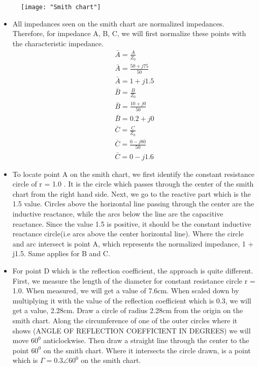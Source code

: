\begin{figure}
	\texttt{[image: "Smith chart"]}
\end{figure}
\begin{itemize}
	\item All impedances seen on the smith chart are normalized impedances. Therefore, for impedance A, B, C, we will first normalize these points with the characteristic impedance.\\
   \begin{align*}
   \bar{A}=\frac{A}{Z_{0}}\\
   \bar{A}=\frac{50 + j75}{50}\\
   \bar{A}=1+j1.5\\
   \bar{B}=\frac{B}{Z_{0}}\\
   \bar{B}= \frac{10 + j0}{50}\\
   \bar{B}=0.2+j0\\
   \bar{C}=\frac{C}{Z_{0}}\\
   \bar{C}= \frac{0 - j80}{50}\\
   \bar{C}=0-j1.6
   \end{align*}
	
	\item 
	To locate point A on the smith chart, we first identify the constant resistance circle of r = 1.0 . It is the circle which passes through the center of the smith chart from the right hand side. Next, we go to the reactive part which is the 1.5 value. Circles above the horizontal line passing through the center are the inductive reactance, while the arcs below the line are the capacitive reactance. Since the value 1.5 is positive, it should be the constant inductive reactance circle(i.e arcs above the center horizontal line). Where the circle and arc intersect is point A, which represents the normalized impedance, 1 + j1.5. Same applies for B and C.
	
	\item 
	For point D which is the reflection coefficient, the approach is quite different. First, we measure the length of the diameter for constant resistance circle r = 1.0. When measured, we will get a value of 7.6cm. When scaled down by multiplying it with the value of the reflection coefficient which is 0.3, we will get a value, 2.28cm. Draw a circle of radius 2.28cm from the origin on the smith chart. Along the circumference of one of the outer circles where it shows (ANGLE OF REFLECTION COEFFICIENT IN DEGREES) we will move $60^0$ anticlockwise. Then draw a straight line through the center to the point $60^0$ on the smith chart. Where it intersects the circle drawn, is a point  which is $\Gamma = 0.3\angle60^{0}$ on the smith chart.
	

\end{itemize}
